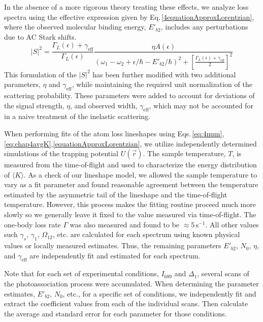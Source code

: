 In the absence of a more rigorous theory treating these effects, we analyze loss spectra using the effective expression given by Eq.\,\ref{4equationApproxLorentzian}, where the observed molecular binding energy, $E'_{b2}$, includes any perturbations due to AC Stark shifts.
\begin{equation}\label{4equationApproxLorentzian}
  \vert S \vert^2 = \frac{\Gamma_L(\epsilon)+\gamma_{\text{eff}}}{\Gamma_L(\epsilon)} \frac{\eta  A(\epsilon)} {\left(\omega_1-\omega_2+\epsilon/\hbar-E'_{b2}/\hbar\right)^2+\left[
  	\frac{\Gamma_L(\epsilon)+\gamma_{\text{eff}}}{2}\right]^2}
\end{equation}
This formulation of the $\vert S \vert^2$ has been further modified with two additional parameters, $\eta$ and $\gamma_{\text{eff}}$, while maintaining the required unit normalization of the scattering probability.
These parameters were added to account for deviations of the signal strength, $\eta$, and observed width, $\gamma_{\text{eff}}$, which may not be accounted for in a naive treatment of the inelastic scattering.

When performing fits of the atom loss lineshapes using Eqs.\,\ref{eq:4num},\ref{eq:chap4avgK},\ref{equationApproxLorentzian}, we utilize independently determined simulations of the trapping potential $U(\vec{r})$.
The sample temperature, $T$, is measured from the time-of-flight and used to characterize the energy distribution of $\langle K \rangle$.
As a check of our lineshape model, we allowed the sample temperature to vary as a fit parameter and found reasonable agreement between the temperature estimated by the asymmetric tail of the lineshape and the time-of-flight temperature.
However, this process makes the fitting routine proceed much more slowly so we generally leave it fixed to the value measured via time-of-flight.
The one-body loss rate $\Gamma$ was also measured and found to be $\approx5$\,s$^{-1}$.
All other values such $\gamma_s$, $\gamma_1$, $\Omega_{12}$, etc. are calculated for each spectrum using known physical values or locally measured estimates.
Thus, the remaining parameters $E'_{b2}$, $N_0$, $\eta$, and $\gamma_{\text{eff}}$ are independently fit and estimated for each spectrum.

Note that for each set of experimental conditions, $I_{689}$ and $\Delta_1$, several scans of the photoassociation process were accumulated. 
When determining the parameter estimates, $E'_{b2}$, $N_0$, etc., for a specific set of conditions, we independently fit and extract the coefficient values from each of the individual scans.
Then calculate the average and standard error for each parameter for those conditions.

